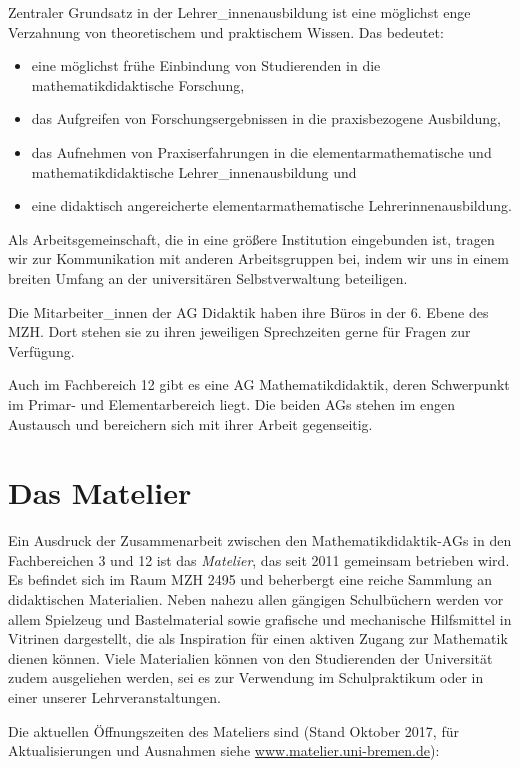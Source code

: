 \documentclass[ngerman,oneside,12pt,a4paper]{scrbook}
\begin{document}
Zentraler Grundsatz in der Lehrer\_innenausbildung ist eine möglichst
enge Verzahnung von theoretischem und praktischem Wissen. Das bedeutet:

\begin{itemize}
\item
  eine möglichst frühe Einbindung von Studierenden in die
  mathematikdidaktische Forschung,
\item
  das Aufgreifen von Forschungsergebnissen in die praxisbezogene
  Ausbildung,
\item
  das Aufnehmen von Praxiserfahrungen in die elementarmathematische und
  mathematikdidaktische Lehrer\_innenausbildung und
\item
  eine didaktisch angereicherte elementarmathematische
  Lehrerinnenausbildung.
\end{itemize}

Als Arbeitsgemeinschaft, die in eine größere Institution eingebunden
ist, tragen wir zur Kommunikation mit anderen Arbeitsgruppen bei, indem
wir uns in einem breiten Umfang an der universitären Selbstverwaltung
beteiligen.

Die Mitarbeiter\_innen der AG Didaktik haben ihre Büros in der 6. Ebene
des MZH. Dort stehen sie zu ihren jeweiligen Sprechzeiten gerne für
Fragen zur Verfügung.

Auch im Fachbereich 12 gibt es eine AG Mathematikdidaktik, deren
Schwerpunkt im Primar- und Elementarbereich liegt. Die beiden AGs stehen
im engen Austausch und bereichern sich mit ihrer Arbeit gegenseitig.

\section{Das Matelier}\label{das-matelier}

Ein Ausdruck der Zusammenarbeit zwischen den Mathematikdidaktik-AGs in
den Fachbereichen 3 und 12 ist das \emph{Matelier}, das seit 2011
gemeinsam betrieben wird. Es befindet sich im Raum MZH 2495 und
beherbergt eine reiche Sammlung an didaktischen Materialien. Neben
nahezu allen gängigen Schulbüchern werden vor allem Spielzeug und
Bastelmaterial sowie grafische und mechanische Hilfsmittel in Vitrinen
dargestellt, die als Inspiration für einen aktiven Zugang zur Mathematik
dienen können. Viele Materialien können von den Studierenden der
Universität zudem ausgeliehen werden, sei es zur Verwendung im
Schulpraktikum oder in einer unserer Lehrveranstaltungen.

Die aktuellen Öffnungszeiten des Mateliers sind (Stand Oktober 2017, für
Aktualisierungen und Ausnahmen siehe
\href{https://www.matelier.uni-bremen.de}{www.matelier.uni-bremen.de}):
\end{document}
